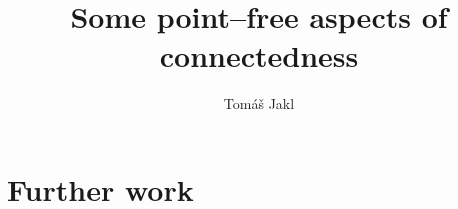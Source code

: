 \documentclass[12pt,a4paper]{report}
\title{Some point--free aspects of connectedness}
\author{Tom\'a\v s Jakl}
\theoremstyle{newthmstyle}
\theoremstyle{newthmstyleNormal}
\begin{document}
\maketitle
\tableofcontents









\chapter{Further work}


\nocite{*}



\clearpage
{}
\printindex
\end{document}
